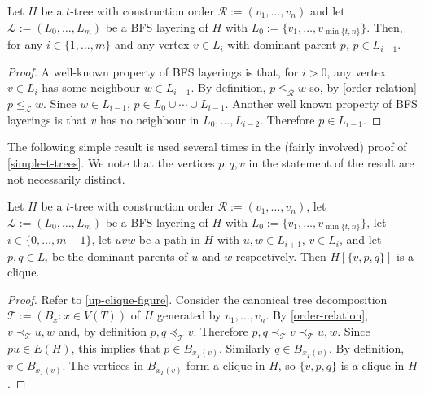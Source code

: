 \documentclass[kpfonts]{patmorin}
\theoremstyle{named}
\begin{document}
\begin{obs}\label{dominant-parent}
    Let $H$ be a $t$-tree with construction order $\mathcal{R}:=(v_1,\ldots,v_n)$ and let $\mathcal{L}:=(L_0,\ldots,L_m)$ be a BFS layering of $H$ with $L_0:=\{v_1,\ldots,v_{\min\{t,n\}}\}$.  Then, for any $i\in\{1,\ldots,m\}$ and any vertex $v\in L_{i}$ with dominant parent $p$, $p\in L_{i-1}$.
\end{obs}

\begin{proof}
    A well-known property of BFS layerings is that, for $i>0$, any vertex $v\in L_{i}$ has some neighbour $w\in L_{i-1}$.  By definition, $p\le_\mathcal{R} w$ so, by \cref{order-relation} $p\le_\mathcal{L} w$. Since $w\in L_{i-1}$, $p\in L_0\cup\cdots\cup L_{i-1}$.  Another well known property of BFS layerings is that $v$ has no neighbour in $L_0,\ldots,L_{i-2}$.  Therefore $p\in L_{i-1}$.
\end{proof}

The following simple result is used several times in the (fairly involved) proof of \cref{simple-t-trees}.  We note that the vertices $p,q,v$ in the statement of the result are not necessarily distinct.

\begin{obs}\label{up-clique}
    Let $H$ be a $t$-tree with construction order $\mathcal{R}:=(v_1,\ldots,v_n)$, let $\mathcal{L}:=(L_0,\ldots,L_m)$ be a BFS layering of $H$ with $L_0:=\{v_1,\ldots,v_{\min\{t,n\}}\}$, let $i\in\{0,\ldots,m-1\}$, let $uvw$ be a path in $H$ with $u,w\in L_{i+1}$, $v\in L_{i}$, and let $p,q\in L_{i}$ be the dominant parents of $u$ and $w$ respectively.  Then $H[\{v,p,q\}]$ is a clique.
\end{obs}


\begin{proof}
    Refer to \cref{up-clique-figure}. Consider the canonical tree decomposition $\mathcal{T}:=(B_x:x\in V(T))$ of $H$ generated by $v_1,\ldots,v_n$.  By \cref{order-relation}, $v\prec_{\mathcal{T}} u,w$ and, by definition $p,q\preceq_{\mathcal{T}} v$.  Therefore $p,q\prec_{\mathcal{T}} v\prec_{\mathcal{T}} u,w$.  Since $pu\in E(H)$, this implies that $p\in B_{x_T(v)}$.  Similarly $q\in B_{x_T(v)}$.  By definition, $v\in B_{x_T(v)}$.  The vertices in $B_{x_T(v)}$ form a clique in $H$, so $\{v,p,q\}$ is a clique in $H$.
\end{proof}
\end{document}
